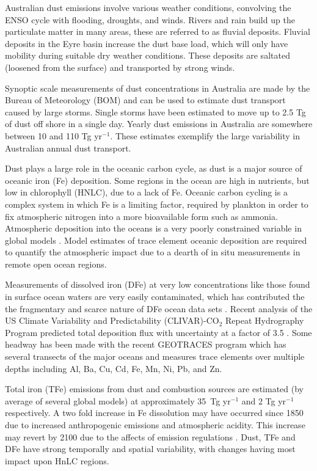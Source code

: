   Australian dust emissions involve various weather conditions, convolving the ENSO cycle with flooding, droughts, and winds.
  Rivers and rain build up the particulate matter in many areas, these are referred to as fluvial deposits.
  Fluvial deposits in the Eyre basin increase the dust base load, which will only have mobility during suitable dry weather conditions.
  These deposits are saltated (loosened from the surface) and transported by strong winds\citep{Zender2003}.

  Synoptic scale measurements of dust concentrations in Australia are made by the Bureau of Meteorology (BOM) and can be used to estimate dust transport caused by large storms. 
  Single storms have been estimated to move up to 2.5 Tg of dust off shore in a single day.
  Yearly dust emissions in Australia are somewhere between 10 and 110 Tg yr$^{-1}$.
  These estimates exemplify the large variability in Australian annual dust transport.

  Dust plays a large role in the oceanic carbon cycle, as dust is a major source of oceanic iron (Fe) deposition.
  Some regions in the ocean are high in nutrients, but low in chlorophyll (HNLC), due to a lack of Fe.
  Oceanic carbon cycling is a complex system in which Fe is a limiting factor, required by plankton in order to fix atmospheric nitrogen into a more bioavailable form such as ammonia.
  Atmospheric deposition into the oceans is a very poorly constrained variable in global models \citep{Grand2015}.
  Model estimates of trace element oceanic deposition are required to quantify the atmospheric impact due to a dearth of in situ measurements in remote open ocean regions.

  Measurements of dissolved iron (DFe) at very low concentrations like those found in surface ocean waters are very easily contaminated, which has contributed the the fragmentary and scarce nature of DFe ocean data sets \citep{Rijkenberg_2014}.
  Recent analysis of the US Climate Variability and Predictability (CLIVAR)-CO$_{2}$ Repeat Hydrography Program predicted total deposition flux with uncertainty at a factor of 3.5 \citep{Grand2015}.
  Some headway has been made with the recent GEOTRACES program which has several transects of the major oceans and measures trace elements over multiple depths including Al, Ba, Cu, Cd, Fe, Mn, Ni, Pb, and Zn.
    
  Total iron (TFe) emissions from dust and combustion sources are estimated (by average of several global models) at approximately 35~Tg yr$^{-1}$ and 2 Tg yr$^{-1}$ respectively. A two fold increase in Fe dissolution may have occurred since 1850 due to increased anthropogenic emissions and atmospheric acidity.
  This increase may revert by 2100 due to the affects of emission regulations \citep{Myriokefalitakis_2015}.
  Dust, TFe and DFe have strong temporally and spatial variability, with changes having most impact upon HnLC regions.

